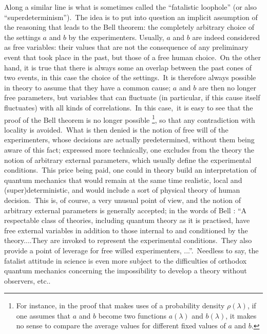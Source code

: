\documentclass[12pt,onecolumn]{article}%
\begin{document}
Along a similar line is what is sometimes called the ``fatalistic loophole''
(or also ``superdeterminism'').\ The idea is to put into question an implicit
assumption of the reasoning that leads to the Bell theorem: the completely
arbitrary choice of the settings $a$ and $b$ by the experimenters. Usually,
$a$ and $b$ are indeed considered as free variables: their values that are not
the consequence of any preliminary event that took place in the past, but
those of a free human choice.\ On the other hand, it is true that there is
always some an overlap between the past cones of two events, in this case the
choice of the settings.\ It is therefore always possible in theory to assume
that they have a common cause; $a$ and $b$ are then no longer free parameters,
but variables that can fluctuate (in particular, if this cause itself
fluctuates) with all kinds of correlations.\ In this case,\ it is easy to see
that the proof of the Bell theorem is no longer possible \footnote{For
instance, in the proof that makes uses of a probability density $\rho
(\lambda)$, if one assumes that $a$ and $b$ become two functions $a(\lambda)$
and $b(\lambda)$, it makes no sense to compare the average values for
different fixed values of $a$ and $b$.}, so that any contradiction with
locality is avoided.\ What is then denied is the notion of free will of the
experimenters, whose decisions are actually predetermined, without them being
aware of this fact; expressed more technically, one excludes from the theory
the notion of arbitrary external parameters, which usually define the
experimental conditions.\ This price being paid, one could in theory build an
interpretation of quantum mechanics that would remain at the same time
realistic, local and (super)deterministic, and would include a sort of
physical theory of human decision.\ This is, of course, a very unusual point
of view, and the notion of arbitrary external parameters is generally
accepted; in the words of Bell \cite{Bell-once-only}: ``A respectable class of
theories, including quantum theory as it is practised, have free external
variables in addition to those internal to and conditioned by the
theory....They are invoked to represent the experimental conditions.\ They
also provide a point of leverage for free willed experimenters,
...''.\ Needless to say, the fatalist attitude in science is even more subject
to the difficulties of orthodox quantum mechanics concerning the impossibility
to develop a theory without observers, etc..
\end{document}
